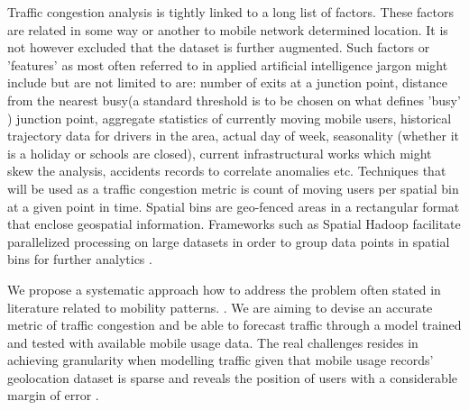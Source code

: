 \documentclass[12pt, a4paper]{report}
\theoremstyle{definition}
\theoremstyle{definition}%
\theoremstyle{definition}%
\theoremstyle{definition}%
\theoremstyle{definition}%
\theoremstyle{definition}%
\begin{document}
Traffic congestion analysis is tightly linked to a long list of factors. These factors are related in some way or another to mobile network determined location. It is not however excluded that the dataset is further augmented. Such factors or 'features' as most often referred to in applied artificial intelligence jargon might include but are not limited to are: number of exits at a junction point, distance from the nearest busy(a standard threshold is to be chosen on what defines 'busy' ) junction point, aggregate statistics of currently moving mobile users, historical trajectory data for drivers in the area, actual day of week, seasonality (whether it is a holiday or schools are closed), current infrastructural works which might skew the analysis, accidents records to correlate anomalies etc. Techniques that will be used as a traffic congestion metric is count of moving users per spatial bin at a given point in time\cite{Alarabi2014}. Spatial bins are geo-fenced areas in a rectangular format that enclose geospatial information. Frameworks such as Spatial Hadoop facilitate parallelized processing on large datasets in order to group data points in spatial bins for further analytics \cite{Alarabi2014}. 

We propose a systematic approach how to address the problem often stated in literature related to mobility patterns.  \cite{Calabrese2013} \cite{Toole2015} \cite{Hoteit2014} \cite{Alexander2015}. We are aiming to devise an accurate metric of traffic congestion and be able to forecast traffic through a model trained and tested with available mobile usage data. The real challenges resides in achieving granularity when modelling traffic given that mobile usage records' geolocation dataset is sparse and reveals the position of users with a considerable margin of error \cite{Hoteit2014} \cite{Gonzalez2008}.
\end{document}
